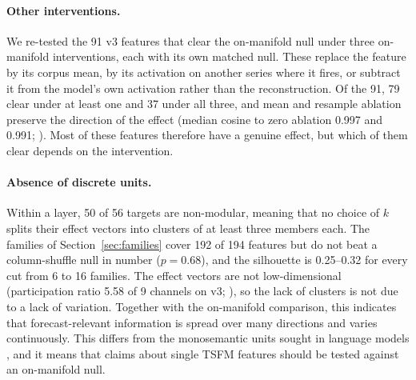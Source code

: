 \paragraph{Other interventions.} We re-tested the 91 v3 features
that clear the on-manifold null under three on-manifold interventions, each with its own matched null. These replace the
feature by its corpus mean, by its activation on another series where it fires, or subtract it from the model's own
activation rather than the reconstruction. Of the 91, 79 clear under at least one and 37 under all three, and mean and resample
ablation preserve the direction of the effect (median cosine to zero ablation 0.997 and 0.991; ). Most of
these features therefore have a genuine effect, but which of them clear depends on the intervention.

\paragraph{Absence of discrete units.} Within a layer, 50 of 56 targets are non-modular, meaning that no
choice of $k$ splits their effect vectors into clusters of at least three members each. The families of
Section~\ref{sec:families} cover 192 of 194 features but do not beat a column-shuffle null in number ($p=0.68$), and the
silhouette is 0.25--0.32 for every cut from 6 to 16 families. The effect vectors are not low-dimensional (participation
ratio 5.58 of 9 channels on v3; ), so the lack of clusters is not due to a lack of variation. Together with the
on-manifold comparison, this indicates that forecast-relevant information is spread over many directions and varies
continuously. This differs from the monosemantic units sought in language models
\citep{bricken2023monosemanticity}, and it means that claims about single TSFM features should be tested against an
on-manifold null.

